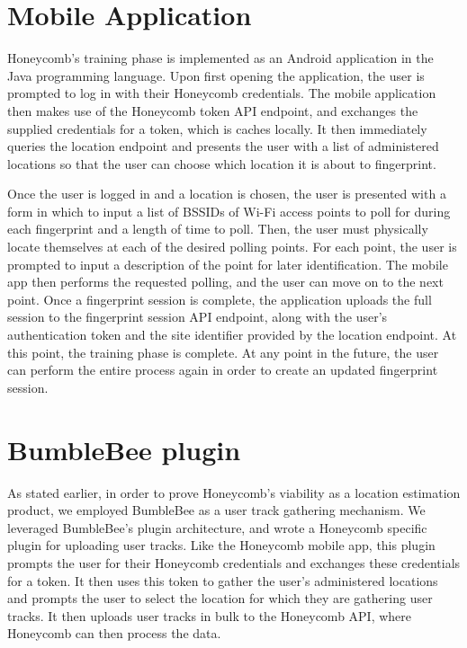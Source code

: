 \section{Mobile Application}
%

Honeycomb's training phase is implemented as an Android application in the Java programming language. Upon first opening the application, the user is prompted to log in with their Honeycomb credentials. The mobile application then makes use of the Honeycomb token API endpoint, and exchanges the supplied credentials for a token, which is caches locally. It then immediately queries the location endpoint and presents the user with a list of administered locations so that the user can choose which location it is about to fingerprint. 

Once the user is logged in and a location is chosen, the user is presented with a form in which to input a list of BSSIDs of Wi-Fi access points to poll for during each fingerprint and a length of time to poll. Then, the user must physically locate themselves at each of the desired polling points. For each point, the user is prompted to input a description of the point for later identification. The mobile app then performs the requested polling, and the user can move on to the next point. Once a fingerprint session is complete, the application uploads the full session to the fingerprint session API endpoint, along with the user's authentication token and the site identifier provided by the location endpoint. At this point, the training phase is complete. At any point in the future, the user can perform the entire process again in order to create an updated fingerprint session.


\section{BumbleBee plugin}
%


As stated earlier, in order to prove Honeycomb's viability as a location estimation product, we employed BumbleBee as a user track gathering mechanism. We leveraged BumbleBee's plugin architecture, and wrote a Honeycomb specific plugin for uploading user tracks. Like the Honeycomb mobile app, this plugin prompts the user for their Honeycomb credentials and exchanges these credentials for a token. It then uses this token to gather the user's administered locations and prompts the user to select the location for which they are gathering user tracks. It then uploads user tracks in bulk to the Honeycomb API, where Honeycomb can then process the data.